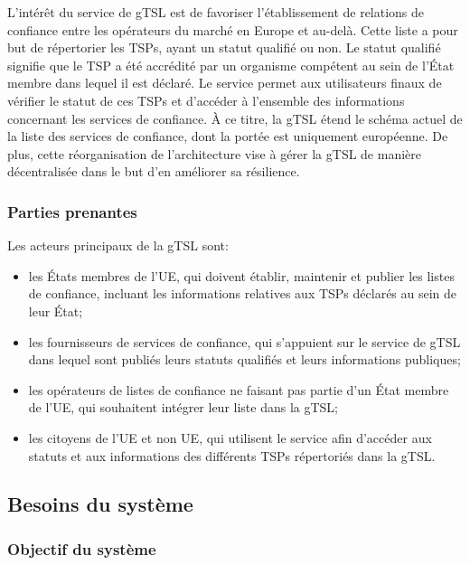\documentclass{tnreport}
\begin{document}
L'intérêt du service de gTSL est de favoriser l'établissement de relations de confiance entre les opérateurs du marché en Europe et au-delà. Cette liste a pour but de répertorier les TSPs, ayant un statut qualifié ou non. 
Le statut qualifié signifie que le TSP a été accrédité par un organisme compétent au sein de l’État membre dans lequel il est déclaré. Le service permet aux utilisateurs finaux de vérifier le statut de ces TSPs et d'accéder à l'ensemble des informations concernant les services de confiance. À ce titre, la gTSL étend le schéma actuel de la liste des services de confiance, dont la portée est uniquement européenne. De plus, cette réorganisation de l'architecture vise à gérer la gTSL de manière décentralisée dans le but d'en améliorer sa résilience.

\subsubsection{Parties prenantes}

Les acteurs principaux de la gTSL sont:
\begin{itemize}
	\item les États membres de l'UE, qui doivent établir, maintenir et publier les listes de confiance, incluant les informations relatives aux TSPs déclarés au sein de leur État;
	\item les fournisseurs de services de confiance, qui s'appuient sur le service de gTSL dans lequel sont publiés leurs statuts qualifiés et leurs informations publiques;
	\item les opérateurs de listes de confiance ne faisant pas partie d'un État membre de l'UE, qui souhaitent intégrer leur liste dans la gTSL;
	\item les citoyens de l'UE et non UE, qui utilisent le service afin d'accéder aux statuts et aux informations des différents TSPs répertoriés dans la gTSL.
	\newline
\end{itemize}

\subsection{Besoins du système}
\label{sec:system-requirements}

\subsubsection{Objectif du système}
\end{document}
